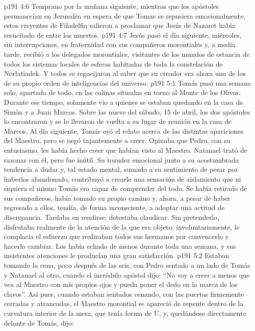 \vs p191 4:6 Temprano por la mañana siguiente, mientras que los apóstoles permanecían en Jerusalén en espera de que Tomas se repusiera emocionalmente, estos creyentes de Filadelfia salieron a proclamar que Jesús de Nazaret había resucitado de entre los muertos.
\vs p191 4:7 Jesús pasó el día siguiente, miércoles, sin interrupciones, en fraternidad con sus compañeros morontiales y, a media tarde, recibió a los delegados morontiales, visitantes de los mundos de estancia de todos los sistemas locales de esferas habitadas de toda la constelación de Norlatiadek. Y todos se regocijaron al saber que su creador era ahora uno de los de su propio orden de inteligencias del universo.
\vs p191 5:1 Tomás pasó una semana solo, apartado de todo, en las colinas situadas en torno al Monte de los Olivos. Durante ese tiempo, solamente vio a quienes se estaban quedando en la casa de Simón y a Juan Marcos. Sobre las nueve del sábado, 15 de abril, los dos apóstoles lo encontraron y se lo llevaron de vuelta a su lugar de reunión en la casa de Marcos. Al día siguiente, Tomás oyó el relato acerca de las distintas apariciones del Maestro, pero se negó tajantemente a creer. Opinaba que Pedro, con su entusiasmo, les había hecho creer que habían visto al Maestro. Natanael trató de razonar con él, pero fue inútil. Su tozudez emocional junto a su acostumbrada tendencia a dudar y, tal estado mental, sumado a su sentimiento de pesar por haberlos abandonado, contribuyó a crearle una sensación de aislamiento que ni siquiera el mismo Tomás era capaz de comprender del todo. Se había retirado de sus compañeros, había tomado su propio camino y, ahora, a pesar de haber regresado a ellos, tendía, de forma inconsciente, a adoptar una actitud de discrepancia. Tardaba en rendirse; detestaba claudicar. Sin pretenderlo, disfrutaba realmente de la atención de la que era objeto; involuntariamente, le complacía el esfuerzo que realizaban todos sus hermanos por convencerlo y hacerlo cambiar. Los había echado de menos durante toda una semana, y sus insistentes atenciones le producían una gran satisfacción.
\vs p191 5:2 Estaban tomando la cena, poco después de las seis, con Pedro sentado a un lado de Tomás y Natanael al otro, cuando el incrédulo apóstol dijo: “No voy a creer a menos que vea al Maestro con mis propios ojos y pueda poner el dedo en la marca de los clavos”. Así pues, cuando estaban sentados cenando, con las puertas firmemente cerradas y atrancadas, el Maestro morontial se apareció de repente dentro de la curvatura interior de la mesa, que tenía forma de U, y, quedándose directamente delante de Tomás, dijo:
